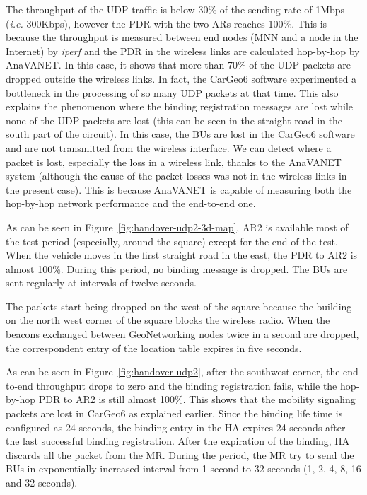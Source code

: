 \documentclass[fonts]{icst}
\begin{document}
The throughput of the UDP traffic is below 30\% of the sending rate of 1Mbps
(\textit{i.e.} 300Kbps), however the PDR with the two ARs reaches 100\%. This is
because the throughput is measured between end nodes (MNN and a node in the
Internet) by \textit{iperf} and the PDR in the wireless links are calculated 
hop-by-hop by AnaVANET. In this case, it shows that more than 70\% of the UDP packets
are dropped outside the wireless links. In fact, the CarGeo6 software experimented a
bottleneck in the processing of so many UDP packets at that time. 
This also explains the phenomenon where the binding registration messages are
lost while none of the UDP packets are lost (this can be seen in the straight
road in the south part of the circuit). In this case, the BUs are lost in the
CarGeo6 software and are not transmitted from the wireless interface.
We can detect where a packet is lost, especially the loss in a wireless
link, thanks to the AnaVANET system (although the cause of the packet losses was
not in the wireless links in the present case). This is because AnaVANET is
capable of measuring both the hop-by-hop network performance and the end-to-end one. 





As can be seen in Figure~\ref{fig:handover-udp2-3d-map}, AR2 is available
most of the test period (especially, around the square) except for the end of
the test. When the vehicle moves in the first straight road in the east, the PDR
to AR2 is almost 100\%. During this period, no binding message is dropped. The
BUs are sent regularly at intervals of twelve seconds. 




The packets start being dropped on the west of the square because the building
on the north west corner of the square blocks the wireless radio. When the
beacons exchanged between GeoNetworking nodes twice in a second are dropped, the
correspondent entry of the location table expires in five seconds.

As can be seen in Figure~\ref{fig:handover-udp2}, after the southwest corner, the
end-to-end throughput drops to zero and the binding registration fails, while
the hop-by-hop PDR to AR2 is still almost 100\%. This shows that the mobility
signaling packets are lost in CarGeo6 as explained earlier. Since the binding
life time is configured as 24 seconds, the binding entry in the HA expires 24
seconds after the last successful binding registration. After the expiration of
the binding, HA discards all the packet from the MR. During the period, 
the MR try to send the BUs in exponentially increased interval from 1
second to 32 seconds (1, 2, 4, 8, 16 and 32 seconds). 
\end{document}
